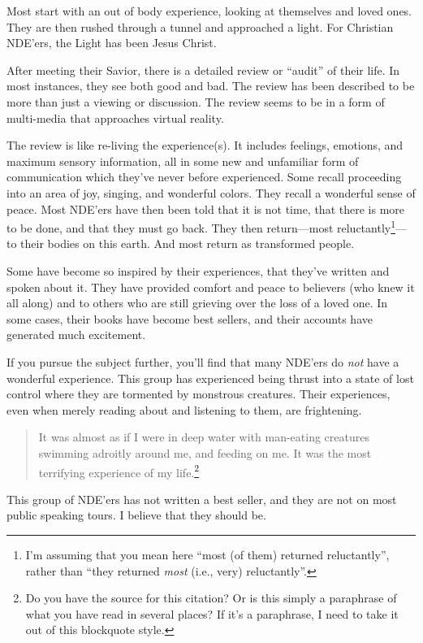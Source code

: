 \documentclass[12pt]{memoir}
\begin{document}
Most start with an out of body experience, looking at themselves and loved ones. They are then rushed through a tunnel and approached a light. For Christian NDE'ers, the Light has been Jesus Christ.

After meeting their Savior, there is a detailed review or ``audit'' of their life. In most instances, they see both good and bad. The review has been described to be more than just a viewing or discussion. The review
seems to be in a form of multi-media that approaches virtual reality.

The review is like re-living the experience(s). It includes feelings, emotions, and maximum sensory information, all in some new and unfamiliar form of communication which they've never before experienced. Some recall proceeding into an area of joy, singing, and wonderful colors. They recall a wonderful sense of peace. Most NDE'ers have then been told that it is not time, that there is more to be done, and that they must go back. They then return---most reluctantly\footnote{I'm assuming that you mean here ``most (of them) returned reluctantly'', rather than ``they returned \emph{most} (i.e., very) reluctantly''.}---to their bodies on this earth. And most return as transformed people.

Some have become so inspired by their experiences, that they've written and spoken about it. They have provided comfort and peace to believers (who knew it all along) and to others who are still grieving over the loss of a loved one. In some cases, their books have become best sellers, and their accounts have generated much excitement. 

If you pursue the subject further, you'll find that many NDE'ers do \emph{not} have a wonderful experience. This group has experienced being thrust into a state of lost control where they are tormented by monstrous creatures. Their experiences, even when merely reading about and listening to them, are frightening.

\begin{quote}
It was almost as if I were in deep water
with man-eating creatures swimming adroitly around me, and feeding
on me. It was the most terrifying experience of my life.\footnote{Do you have the source for this citation? Or is this simply a paraphrase of what you have read in several places? If it's a paraphrase, I need to take it out of this blockquote style.}
\end{quote}

This group of NDE'ers has not written a best seller, and they are not on most public speaking tours. I believe that they should be. 
\end{document}
